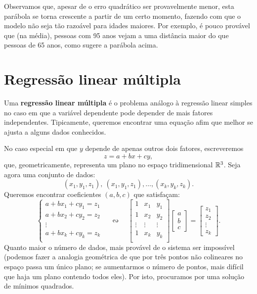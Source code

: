 \documentclass[../livro.tex]{subfiles}  %
\begin{document}
\begin{example}
  \noindent Observamos que, apesar de o erro quadrático ser provavelmente menor, esta parábola se torna crescente a partir de um certo momento, fazendo com que o modelo não seja tão razoável para idades maiores. Por exemplo, é pouco provável que (na média), pessoas com 95 anos vejam a uma distância maior do que pessoas de 65 anos, como sugere a parábola acima.
\end{example}



\section{Regressão linear múltipla}

Uma \textbf{regressão linear múltipla} é o problema análogo à regressão linear simples no caso em que a variável dependente pode depender de mais fatores independentes. Tipicamente, queremos encontrar uma equação afim que melhor se ajusta a alguns dados conhecidos.

No caso especial em que $y$ depende de apenas outros dois fatores, escreveremos
\begin{equation}
z = a + b x + c y,
\end{equation} que, geometricamente, representa um plano no espaço tridimensional $\mathbb{R}^3$. Seja agora uma conjunto de dados:
\begin{equation}
(x_1, y_1, z_1), \ (x_1, y_1, z_1), \dots, (x_k, y_k, z_k).
\end{equation} Queremos encontrar coeficientes $(a,b,c)$ que satisfaçam:
\begin{equation}
\left\{
  \begin{array}{c}
    a + b x_1 + c y_1 = z_1 \\
    a + b x_2 + c y_2 = z_2 \\
    \vdots \\
    a + b x_k + c y_k = z_k \\
  \end{array}
\right. \quad \leftrightsquigarrow \quad
\begin{bmatrix}
  1 & x_1 & y_1 \\
  1 & x_2 & y_2 \\
  \vdots & \vdots & \vdots \\
  1 & x_k & y_k \\
\end{bmatrix}
\begin{bmatrix}
  a \\ b \\ c
\end{bmatrix} =
\begin{bmatrix}
  z_1 \\ z_2 \\ \vdots \\ z_k
\end{bmatrix}.
\end{equation} Quanto maior o número de dados, mais provável de o sistema ser impossível (podemos fazer a analogia geométrica de que por três pontos não colineares no espaço passa um único plano; se aumentarmos o número de pontos, mais difícil que haja um plano contendo todos eles). Por isto, procuramos por uma solução de mínimos quadrados.
\end{document}
